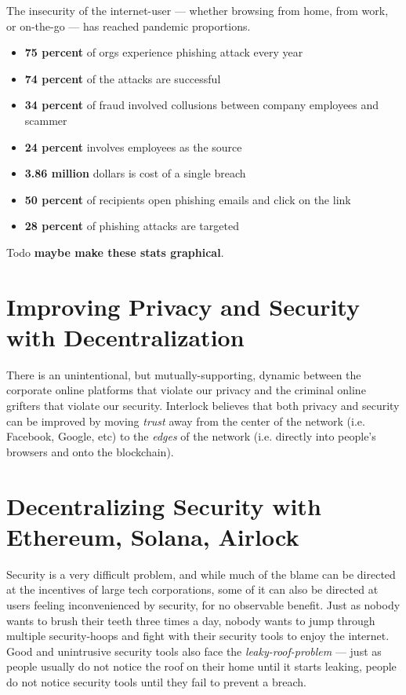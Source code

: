 \documentclass[a4paper]{article}
\begin{document}
The insecurity of the internet-user ---  whether browsing from home, from work, or on-the-go ---  has reached pandemic proportions.

\begin{itemize}\item  \textbf{75 percent} of orgs experience phishing attack every year
\item  \textbf{74 percent} of the attacks are successful
\item  \textbf{34 percent} of fraud involved collusions between company employees and scammer
\item  \textbf{24 percent} involves employees as the source
\item  \textbf{3.86 million} dollars is cost of a single breach
\item  \textbf{50 percent} of recipients open phishing emails and click on the link
\item  \textbf{28 percent} of phishing attacks are targeted
\end{itemize}

Todo \textbf{maybe make these stats graphical}.
\section{Improving Privacy and Security with Decentralization}
\label{Improving Privacy and Security with Decentralization}

There is an unintentional, but mutually-supporting, dynamic between the corporate online platforms that violate our privacy and the criminal online grifters that violate our security. Interlock believes that both privacy and security can be improved by moving \emph{trust} away from the center of the network (i.e. Facebook, Google, etc) to the \emph{edges} of the network (i.e. directly into people's browsers and onto the blockchain).
\section{Decentralizing Security with Ethereum, Solana, Airlock}
\label{Decentralizing Security with Ethereum, Solana, Airlock}

Security is a very difficult problem, and while much of the blame can be directed at the incentives of large tech corporations, some of it can also be directed at users feeling inconvenienced by security, for no observable benefit. Just as nobody wants to brush their teeth three times a day, nobody wants to jump through multiple security-hoops and fight with their security tools to enjoy the internet. Good and unintrusive security tools also face the \emph{leaky-roof-problem} ---  just as people usually do not notice the roof on their home until it starts leaking, people do not notice security tools until they fail to prevent a breach.
\end{document}
